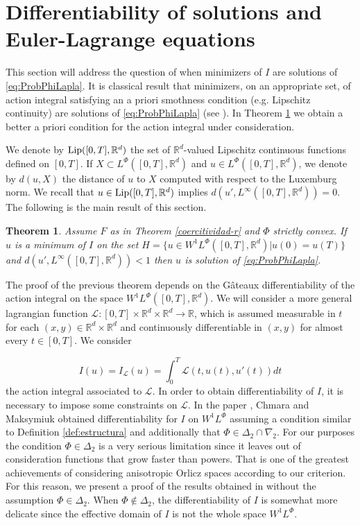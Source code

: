 \documentclass[twoside]{article}
\newtheorem{thm}{Theorem}[section]
\theoremstyle{remark}
\newcommand{\lphi}{L^{\Phi}}
\newcommand{\wphi}{W^{1}\lphi}
\newcommand{\rr}{\mathbb{R}}
\newcommand{\lip}{\mathop{\rm Lip}}
\begin{document}
\section{Differentiability of solutions and Euler-Lagrange equations}\label{sec:diferenciabilidad}


This section will address the question of when minimizers of $I$ are solutions of \eqref{eq:ProbPhiLapla}. It is classical result that minimizers, on an appropriate set, of action integral satisfying an a priori smothness condition (e.g. Lipschitz continuity) are solutions of \eqref{eq:ProbPhiLapla} (see \cite{buttazzo1998one}).  In Theorem \ref{th:tor_prin} we obtain a better a priori condition for the action integral under consideration.

We denote by $\lip([0,T],\rr^d)$ the set of $\rr^d$-valued Lipschitz continuous functions defined on $[0,T]$. If $X\subset \lphi([0,T],\rr^d)$ and $u\in \lphi([0,T],\rr^d)$,  we denote by $d(u,X)$ the distance of $u$ to $X$ computed with respect  to the Luxemburg norm. We recall that  $u\in\lip([0,T],\rr^d)$ implies  $d(u',L^{\infty}([0,T],\rr^d))=0$. The following is the main result of this section.




\begin{thm}\label{th:tor_prin} Assume   $F$ as in Theorem \ref{coercitividad-r} and $\Phi$  strictly convex. If $u$ is a minimum of $I$ on the set $H=\{u\in\wphi([0,T],\rr^d)| u(0)=u(T)\}$ and $d(u',L^{\infty}([0,T],\rr^d))<1$ then $u$ is solution of \eqref{eq:ProbPhiLapla}. 
\end{thm}


The proof of the previous theorem depends on the G\^ateaux differentiability of the action integral on the space $\wphi([0,T],\rr^d)$. We will consider a more general lagrangian function $\mathcal{L}:[0,T]\times\rr^d\times\rr^d\to\rr$, which  is assumed  measurable in $t$ for each $(x,y)\in \rr^d\times\rr^d$ and  continuously differentiable in $(x,y)$ for almost every $t \in [0,T]$. We consider 

\begin{equation}\label{eq:integral_accion_gen} I(u)=I_{\mathcal{L}}(u)=\int_0^T\mathcal{L}(t,u(t),u'(t))dt\tag{$IG$}
\end{equation}
 the action integral associated to $\mathcal{L}$. In order to obtain differentiability of $I$, it is necessary to impose some constraints on $\mathcal{L}$. In the paper \cite{chamra2017anisotropic}, Chmara and Maksymiuk  obtained differentiability for $I$ on $\wphi$ assuming  a condition  similar to Definition \ref{def:estructura} and additionally that $\Phi\in\Delta_2\cap\nabla_2$. For our purposes the condition $\Phi\in\Delta_2$ is a very serious limitation     since it leaves out of consideration functions that grow faster than powers. That is one of the greatest achievements of considering anisotropic Orlicz spaces according to our criterion.  For this reason, we present a proof  of the results obtained in \cite{chamra2017anisotropic} without the assumption $\Phi\in\Delta_2$. When $\Phi\notin\Delta_2$, the  differentiability of $I$ is somewhat more delicate since the effective domain of $I$ is not the whole space $\wphi$. 
\end{document}
